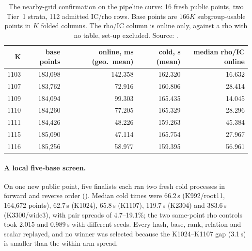 \begin{table}[t]
\centering\small
\begin{tabular}{@{}rrrrr@{}}
\toprule
K & base points & online, ms (geo.\ mean) & cold, s (mean) & median rho/IC online \\
\midrule
1103 & 183{,}098 & 142.358 & 162.320 & 16.632 \\
1107 & 183{,}762 & 72.916 & 160.806 & 28.414 \\
1109 & 184{,}094 & 99.303 & 165.435 & 14.045 \\
1110 & 184{,}260 & 77.205 & 165.329 & 28.296 \\
1111 & 184{,}426 & 48.226 & 159.263 & 45.384 \\
1115 & 185{,}090 & 47.114 & 165.754 & 27.967 \\
1116 & 185{,}256 & 58.977 & 159.395 & 56.961 \\
\bottomrule
\end{tabular}
\caption[]{The nearby-grid confirmation on the pipeline curve: 16 fresh
public points, two Tier~1 strata, 112 admitted IC/rho rows. Base points are
$166K$ subgroup-usable points in $K$ folded columns. The rho/IC column is
online only, against a rho with no table, set-up excluded. Source:
.}
\label{tab:n83l-confirm}
\end{table}

\paragraph{A local five-base screen.} On one new public point, five
finalists each ran two fresh cold processes in forward and reverse order
(). Median cold
times were 66.2\,s (K992/root11, 164{,}672 points), 62.7\,s (K1024), 65.8\,s
(K1107), 119.7\,s (K2304) and 383.6\,s (K3300/wide3), with pair spreads of
4.7--19.1\%; the two same-point rho controls took 2.015 and 0.989\,s with
different seeds. Every hash, base, rank, relation and scalar replayed, and
no winner was selected because the K1024--K1107 gap (3.1\,s) is smaller than
the within-arm spread.

